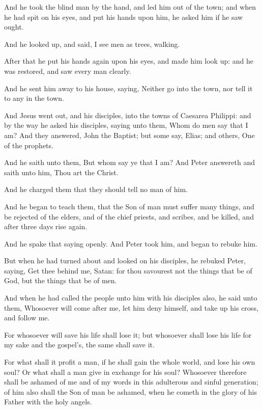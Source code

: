 \Verse And he took the blind man by the hand, and led him out of the town; and when he had spit on his eyes, and put his hands upon him, he asked him if he saw ought.

\Verse And he looked up, and said, I see men as trees, walking.

\Verse After that he put his hands again upon his eyes, and made him look up: and he was restored, and saw every man clearly.

\Verse And he sent him away to his house, saying, Neither go into the town, nor tell it to any in the town.

\Verse And Jesus went out, and his disciples, into the towns of Caesarea Philippi: and by the way he asked his disciples, saying unto them, Whom do men say that I am?  \Verse And they answered, John the Baptist; but some say, Elias; and others, One of the prophets.

\Verse And he saith unto them, But whom say ye that I am? And Peter answereth and saith unto him, Thou art the Christ.

\Verse And he charged them that they should tell no man of him.

\Verse And he began to teach them, that the Son of man must suffer many things, and be rejected of the elders, and of the chief priests, and scribes, and be killed, and after three days rise again.

\Verse And he spake that saying openly. And Peter took him, and began to rebuke him.

\Verse But when he had turned about and looked on his disciples, he rebuked Peter, saying, Get thee behind me, Satan: for thou savourest not the things that be of God, but the things that be of men.

\Verse And when he had called the people unto him with his disciples also, he said unto them, Whosoever will come after me, let him deny himself, and take up his cross, and follow me.

\Verse For whosoever will save his life shall lose it; but whosoever shall lose his life for my sake and the gospel's, the same shall save it.

\Verse For what shall it profit a man, if he shall gain the whole world, and lose his own soul?  \Verse Or what shall a man give in exchange for his soul?  \Verse Whosoever therefore shall be ashamed of me and of my words in this adulterous and sinful generation; of him also shall the Son of man be ashamed, when he cometh in the glory of his Father with the holy angels.


